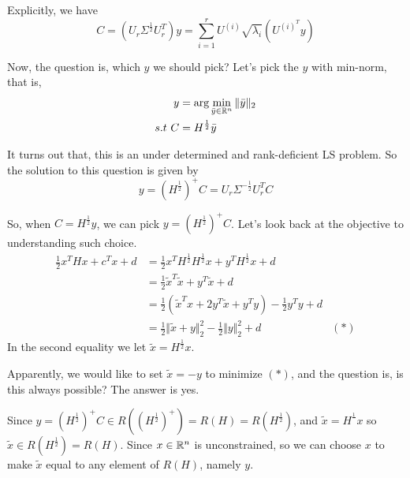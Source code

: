 Explicitly, we have 
\begin{equation*}
C = (U_r\Sigma^{\frac{1}{2}}U_r^T)y = \sum^r_{i=1}U^{(i)}\sqrt{\lambda_i}(U^{(i)^T}y)
\end{equation*}

Now, the question is, which $y$ we should pick? Let's pick the $y$ with min-norm, that is, 
\begin{align*}
y &=\arg\min_{\bar{y}\in\mathbb{R}^n}\Vert \bar{y}\Vert_2\\
s.t\  C &= H^{\frac{1}{2}}\bar{y}
\end{align*}

It turns out that, this is an under determined and rank-deficient LS problem. So the solution to this question is given by
$$y = (H^{\frac{1}{2}})^+C = U_r \Sigma^{-\frac{1}{2}} U_r^T C$$


So, when $C = H^{\frac{1}{2}}y$, we can pick $y = (H^{\frac{1}{2}})^+C$. Let's look back at the objective to understanding such choice.
\begin{align*}
\frac{1}{2}x^THx + c^Tx + d &= \frac{1}{2}x^TH^{\frac{1}{2}}H^{\frac{1}{2}}x+y^TH^{\frac{1}{2}}x + d\\
&= \frac{1}{2}\tilde{x}^T\tilde{x} + y^T\tilde{x} + d\\
&= \frac{1}{2}(\tilde{x}^Tx+2y^T\tilde{x}+y^Ty) - \frac{1}{2}y^Ty + d \\
&= \frac{1}{2}\Vert\tilde{x}+y\Vert^2_2 - \frac{1}{2}\Vert y \Vert^2_2 + d &(*)
\end{align*}
In the second equality we let $\tilde{x} = H^{\frac{1}{2}} x$.

Apparently, we would like to set $\tilde{x} = -y$ to minimize $(*)$, and the question is, is this always possible? The answer is yes.

Since $y = (H^{\frac{1}{2}})^+C\in R((H^{\frac{1}{2}})^+) = R(H) = R(H^{\frac{1}{2}})$, and $\tilde{x}=H^{\frac{1}{}} x$ so $\tilde{x} \in R\left(H^{\frac{1}{2}}\right) = R(H)$. Since $x\in \mathbb{R}^n$ is unconstrained, so we can choose $x$ to make $\tilde{x}$ equal to any element of $R(H)$, namely $y$. 

